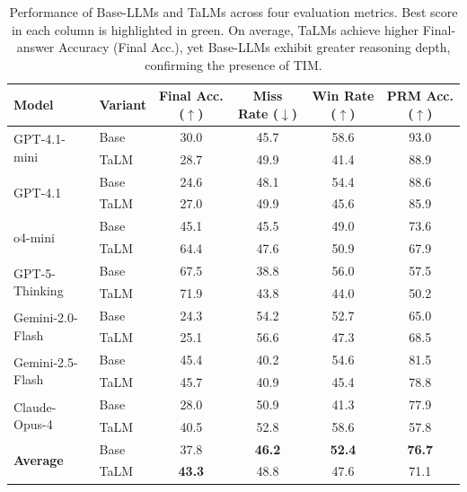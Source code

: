 \documentclass[11pt]{article}
\def \task{\textsc{TIM}\xspace}
\newcommand{\farima}[1]{{\color{orange}Farima: #1}}
\newcommand{\pouya}[1]{{\color{violet}Pouya: #1}}
\newcommand{\postspace}{\vskip -3mm}
\begin{document}
\begin{table}[t]
\centering
\small
\renewcommand{\arraystretch}{0.9}
\begin{tabular}{l l c c c c}
\toprule
\textbf{Model} & \textbf{Variant} & \textbf{Final Acc. ($\uparrow$)} & \textbf{Miss Rate ($\downarrow$)} & \textbf{Win Rate ($\uparrow$)} & \textbf{PRM Acc. ($\uparrow$)} \\
\midrule
\multirow{2}{*}{GPT-4.1-mini} 
 & Base & 30.0 & 45.7 & \colorbox{green!10}{58.6} & \colorbox{green!10}{93.0} \\
 & TaLM & 28.7 & 49.9 & 41.4 & 88.9 \\
\midrule
\multirow{2}{*}{GPT-4.1} 
 & Base & 24.6 & 48.1 & 54.4 & 88.6 \\
 & TaLM & 27.0 & 49.9 & 45.6 & 85.9 \\
\midrule
\multirow{2}{*}{o4-mini} 
 & Base & 45.1 & 45.5 & 49.0 & 73.6 \\
 & TaLM & 64.4 & 47.6 & 50.9 & 67.9 \\
\midrule
\multirow{2}{*}{GPT-5-Thinking} 
 & Base & 67.5 & \colorbox{green!10}{38.8} & 56.0 & 57.5 \\
 & TaLM & \colorbox{green!10}{71.9} & 43.8 & 44.0 & 50.2 \\
\midrule
\multirow{2}{*}{Gemini-2.0-Flash} 
 & Base & 24.3 & 54.2 & 52.7 & 65.0 \\
 & TaLM & 25.1 & 56.6 & 47.3 & 68.5 \\
\midrule
\multirow{2}{*}{Gemini-2.5-Flash} 
 & Base & 45.4 & 40.2 & 54.6 & 81.5 \\
 & TaLM & 45.7 & 40.9 & 45.4 & 78.8 \\
\midrule
\multirow{2}{*}{Claude-Opus-4} 
 & Base & 28.0 & 50.9 & 41.3 & 77.9 \\
 & TaLM & 40.5 & 52.8 & \colorbox{green!10}{58.6} & 57.8 \\
 \midrule
\multirow{2}{*}{\textbf{Average}} & Base & 37.8 & \textbf{46.2} & \textbf{52.4} & \textbf{76.7} \\
                                 & TaLM & \textbf{43.3} & 48.8 & 47.6 & 71.1 \\
\bottomrule
\end{tabular}
\caption{Performance of Base-LLMs and TaLMs across four evaluation metrics. Best score in each column is highlighted in \colorbox{green!10}{green}. On average, TaLMs achieve higher Final-answer Accuracy (Final Acc.), yet Base-LLMs exhibit greater reasoning depth, confirming the presence of \task{}.
}
\vspace{2mm}
\label{tab:main_results}
\postspace
\end{table}
\end{document}
